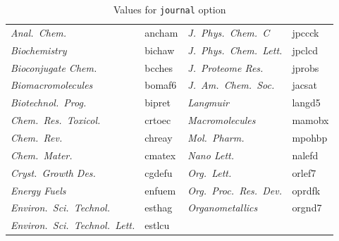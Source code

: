\documentclass[english,journal=jctcce,etalmode=truncate,maxauthors=0]{achemso}
\begin{document}
\begin{table}
\begin{tabular}{@{}>{\itshape}l>{\ttfamily}l>{\itshape}l>{\ttfamily}l@{}}
      Anal.\ Chem.                    & ancham &
      J.~Phys.\ Chem.~C               & jpccck \\
      Biochemistry                    & bichaw &
      J.~Phys.\ Chem.\ Lett.          & jpclcd \\
      Bioconjugate Chem.              & bcches &
      J.~Proteome Res.                & jprobs \\
      Biomacromolecules               & bomaf6 &
      J.~Am.\ Chem.\ Soc.             & jacsat \\
      Biotechnol.\ Prog.              & bipret &
      Langmuir                        & langd5 \\
      Chem.\ Res.\ Toxicol.           & crtoec &
      Macromolecules                  & mamobx \\
      Chem.\ Rev.                     & chreay &
      Mol.\ Pharm.                    & mpohbp \\
      Chem.\ Mater.                   & cmatex &
      Nano Lett.                      & nalefd \\
      Cryst.\ Growth Des.             & cgdefu &
      Org.\ Lett.                     & orlef7 \\
      Energy Fuels                    & enfuem &
      Org.\ Proc.\ Res.\ Dev.         & oprdfk \\
      Environ.\ Sci.\ Technol.        & esthag &
      Organometallics                 & orgnd7 \\
      Environ.\ Sci.\ Technol.\ Lett. & estlcu \\
    \bottomrule
  \end{tabular}
  \caption{Values for \texttt{journal} option}
  \label{tab:journal}
\end{table}

\end{document}
